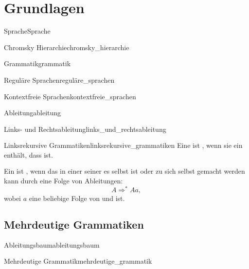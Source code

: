 \section{Grundlagen}
\begin{Definition}{Sprache}{Sprache}
\end{Definition}
\begin{Definition}{Chromsky Hierarchie}{chromsky_hierarchie}
\end{Definition}
\begin{Definition}{Grammatik}{grammatik}
\end{Definition}
\begin{Definition}{Reguläre Sprachen}{reguläre_sprachen}
\end{Definition}
\begin{Definition}{Kontextfreie Sprachen}{kontextfreie_sprachen}
\end{Definition}
\begin{Definition}{Ableitung}{ableitung}
\end{Definition}
\begin{Definition}{Links- und Rechtsableitung}{links_und_rechtsableitung}
\end{Definition}
\begin{Definition}{Linksrekursive Grammatiken}{linksrekursive_grammatiken}
Eine  ist , wenn sie ein   enthält, dass  ist.

Ein  ist  , wenn das  in einer seiner  es selbst ist oder zu sich selbst gemacht werden kann durch eine Folge von Ableitungen:
\begin{equation*}
  A \Rightarrow^{*} Aa,
\end{equation*}
wobei $a$ eine beliebige Folge von  und  ist.
\end{Definition}
\subsection{Mehrdeutige Grammatiken}
\begin{Definition}{Ableitungsbaum}{ableitungsbaum}
\end{Definition}
\begin{Definition}{Mehrdeutige Grammatik}{mehrdeutige_grammatik}
\end{Definition}
